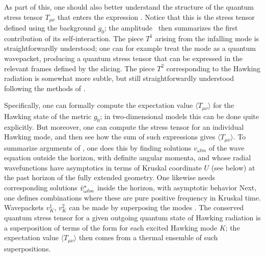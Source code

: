 As part of this, one should also better understand the structure of the quantum stress tensor $T_{\mu\nu}$ that enters the expression \gravpert.  Notice that this is the stress tensor defined using the background $g_0$; the amplitude \treeM\ then summarizes the first contribution of its self-interaction.  The piece $T^1$ arising from the infalling mode is straightforwardly understood; one can for example treat the mode as a quantum wavepacket, producing a quantum stress tensor that can be expressed in the relevant frames defined by the slicing.  The piece $T^2$ corresponding to the Hawking radiation is somewhat more subtle, but still straightforwardly understood following the methods of \SGnonloc.  

Specifically, one can formally compute the expectation value $\langle T_{\mu\nu}\rangle$ for the Hawking state of the metric $g_0$; in two-dimensional models this can be done quite explicitly.  But moreover, one can compute the stress tensor for an individual Hawking mode, and then see how the sum of such expressions gives $\langle T_{\mu\nu}\rangle$.  To summarize arguments of \SGnonloc, one does this by finding solutions $v_{\omega l m}$ of the wave equation outside the horizon, with definite angular momenta, and whose radial wavefunctions have asymptotics 
%
\eqn{}
%
in terms of Kruskal coordinate $U$ (see below) at the past horizon of the fully extended geometry.  One likewise needs corresponding solutions ${\hat v}_{\omega l m}^*$ inside the horizon, with asymptotic behavior 
%
\eqn{}
%
Next, one defines combinations 
%
\eqn{}
%
where
%
\eqn{}
%
these are pure positive frequency in Kruskal time.  Wavepackets $v^1_K$, $v^2_K$ can be made by superposing the modes \vfd.  The conserved quantum stress tensor for a given outgoing quantum state of Hawking radiation is a superposition of terms of the form
%
\eqn{}
%
for each excited Hawking mode $K$; the expectation value $\langle T_{\mu\nu}\rangle$ then comes from a thermal ensemble of such superpositions.

